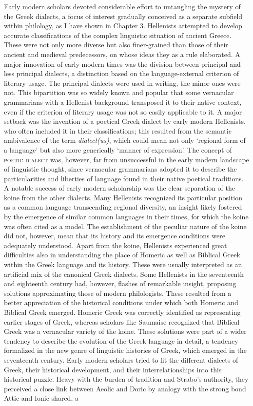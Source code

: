 Early modern scholars devoted considerable effort to untangling the mystery of the Greek dialects, a focus of interest gradually conceived as a separate subfield within philology, as I have shown in Chapter 3. Hellenists attempted to develop accurate classifications of the complex linguistic situation of ancient Greece. These were not only more diverse but also finer-grained than those of their ancient and medieval predecessors, on whose ideas they as a rule elaborated. A major innovation of early modern times was the division between principal and less principal dialects, a distinction based on the language-external criterion of literary usage. The principal dialects were used in writing, the minor ones were not. This bipartition was so widely known and popular that some vernacular grammarians with a Hellenist background transposed it to their native context, even if the criterion of literary usage was not so easily applicable to it. A major setback was the invention of a poetical Greek dialect by early modern Hellenists, who often included it in their classifications; this resulted from the semantic ambivalence of the term \textit{dialect(us)}, which could mean not only ‘regional form of a language’ but also more generically ‘manner of expression’. The concept of \textsc{poetic} \textsc{dialect} was, however, far from unsuccessful in the early modern landscape of linguistic thought, since vernacular grammarians adopted it to describe the particularities and liberties of language found in their native poetical traditions. A notable success of early modern scholarship was the clear separation of the koine from the other dialects. Many Hellenists recognized its particular position as a common language transcending regional diversity, an insight likely fostered by the emergence of similar common languages in their times, for which the koine was often cited as a model. The establishment of the peculiar nature of the koine did not, however, mean that its history and its emergence conditions were adequately understood. Apart from the koine, Hellenists experienced great difficulties also in understanding the place of Homeric as well as Biblical Greek within the Greek language and its history. These were usually interpreted as an artificial mix of the canonical Greek dialects. Some Hellenists in the seventeenth and eighteenth century had, however, flashes of remarkable insight, proposing solutions approximating those of modern philologists. These resulted from a better appreciation of the historical conditions under which both Homeric and Biblical Greek emerged. Homeric Greek was correctly identified as representing earlier stages of Greek, whereas scholars like Saumaise recognized that Biblical Greek was a vernacular variety of the koine. These solutions were part of a wider tendency to describe the evolution of the Greek language in detail, a tendency formalized in the new genre of linguistic histories of Greek, which emerged in the seventeenth century. Early modern scholars tried to fit the different dialects of Greek, their historical development, and their interrelationships into this historical puzzle. Heavy with the burden of tradition and Strabo’s authority, they perceived a close link between Aeolic and Doric by analogy with the strong bond Attic and Ionic shared, a 
